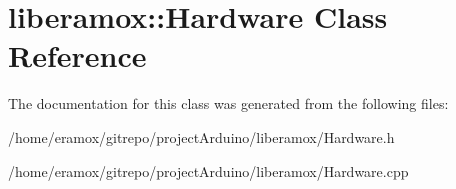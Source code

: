 \hypertarget{classliberamox_1_1Hardware}{}\section{liberamox\+:\+:Hardware Class Reference}
\label{classliberamox_1_1Hardware}


The documentation for this class was generated from the following files\+:\begin{DoxyCompactItemize}
\item 
/home/eramox/gitrepo/project\+Arduino/liberamox/Hardware.\+h\item 
/home/eramox/gitrepo/project\+Arduino/liberamox/Hardware.\+cpp\end{DoxyCompactItemize}

